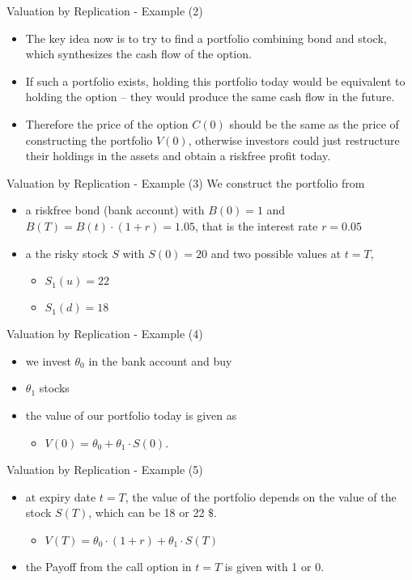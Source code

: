 {Valuation by Replication - Example (2)}
\begin{itemize}
  \item The key idea now is to try to find a portfolio combining bond and
stock, which synthesizes the cash flow of the option.
\item If such a portfolio exists, holding this portfolio today would be equivalent
to holding the option -- they would produce the same cash flow in
the future.
\item Therefore the price of the option $C(0)$ should be the same
as the price of constructing the portfolio $V(0)$, otherwise investors
could just restructure their holdings in the assets and obtain a
riskfree profit today.
\end{itemize}

{Valuation by Replication - Example (3)}
We construct the portfolio from
\begin{itemize}
\item a riskfree bond (bank account) with $B(0)=1$ and $B(T)=B(t) \cdot (1+r) = 1.05$,
that is the interest rate $r=0.05$
\item a the risky stock $S$ with $S(0) = 20$ and two
possible values at $t=T$,
\begin{itemize}
\item $S_1(u)=22$
\item $S_1(d)=18$
\end{itemize}
\end{itemize}

{Valuation by Replication - Example (4)}
\begin{itemize}
  \item we invest $\theta_0$ in the bank account and buy
  \item $\theta_1$ stocks
  \item the value of our portfolio today is given as
  \begin{itemize}
    \item $V(0) = \theta_0 + \theta_1 \cdot S(0)$.
  \end{itemize}
\end{itemize}

{Valuation by Replication - Example (5)}
\begin{itemize}
  \item at expiry date $t=T$, the value of the portfolio depends on the value of the stock $S(T)$, which can be 18 or 22 $\$$.
  \begin{itemize}
    \item $V(T) = \theta_0 \cdot (1+r) + \theta_1 \cdot S(T)$
  \end{itemize}
  \item the Payoff from the call option in $t=T$ is given with 1 or 0.
 \end{itemize}


